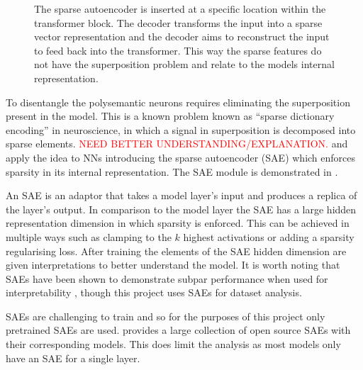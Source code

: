 \begin{figure}
    \centering
    \captionsetup{width=.9\textwidth}
    
    \caption{The sparse autoencoder is inserted at a specific location within the transformer block. The decoder transforms the input into a sparse vector representation and the decoder aims to reconstruct the input to feed back into the transformer. This way the sparse features do not have the superposition problem and relate to the models internal representation.}
    \label{fig:sae}
\end{figure}

To disentangle the polysemantic neurons requires eliminating the superposition present in the model.
This is a known problem known as ``sparse dictionary encoding'' \citep{sparse-coding} in neuroscience, in which a signal in superposition is decomposed into sparse elements. \textcolor{red}{NEED BETTER UNDERSTANDING/EXPLANATION.}
\citet{sae-orig} and \citet{saes} apply the idea to NNs introducing the sparse autoencoder (SAE) which enforces sparsity in its internal representation.
The SAE module is demonstrated in .

An SAE is an adaptor that takes a model layer's input and produces a replica of the layer's output.
In comparison to the model layer the SAE has a large hidden representation dimension in which sparsity is enforced.
This can be achieved in multiple ways such as clamping to the $k$ highest activations \citep{k-sparsity} or adding a sparsity regularising loss.
After training the elements of the SAE hidden dimension are given interpretations to better understand the model.
It is worth noting that SAEs have been shown to demonstrate subpar performance when used for interpretability \citep{saes-bad}, though this project uses SAEs for dataset analysis.

SAEs are challenging to train and so for the purposes of this project only pretrained SAEs are used.
\citet{saelens} provides a large collection of open source SAEs with their corresponding models.
This does limit the analysis as most models only have an SAE for a single layer.
